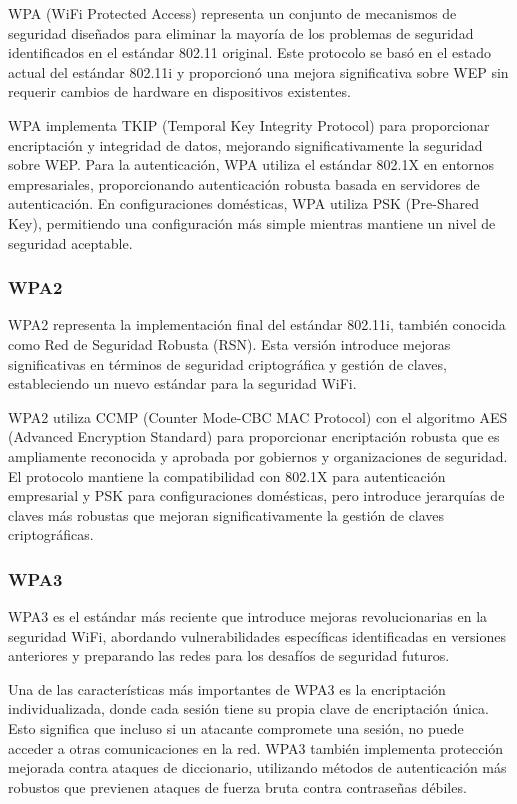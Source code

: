 WPA (WiFi Protected Access) representa un conjunto de mecanismos de seguridad diseñados para eliminar la mayoría de los problemas de seguridad identificados en el estándar 802.11 original. Este protocolo se basó en el estado actual del estándar 802.11i y proporcionó una mejora significativa sobre WEP sin requerir cambios de hardware en dispositivos existentes.

WPA implementa TKIP (Temporal Key Integrity Protocol) para proporcionar encriptación y integridad de datos, mejorando significativamente la seguridad sobre WEP. Para la autenticación, WPA utiliza el estándar 802.1X en entornos empresariales, proporcionando autenticación robusta basada en servidores de autenticación. En configuraciones domésticas, WPA utiliza PSK (Pre-Shared Key), permitiendo una configuración más simple mientras mantiene un nivel de seguridad aceptable.

\subsubsection{WPA2}

WPA2 representa la implementación final del estándar 802.11i, también conocida como Red de Seguridad Robusta (RSN). Esta versión introduce mejoras significativas en términos de seguridad criptográfica y gestión de claves, estableciendo un nuevo estándar para la seguridad WiFi.

WPA2 utiliza CCMP (Counter Mode-CBC MAC Protocol) con el algoritmo AES (Advanced Encryption Standard) para proporcionar encriptación robusta que es ampliamente reconocida y aprobada por gobiernos y organizaciones de seguridad. El protocolo mantiene la compatibilidad con 802.1X para autenticación empresarial y PSK para configuraciones domésticas, pero introduce jerarquías de claves más robustas que mejoran significativamente la gestión de claves criptográficas.

\subsubsection{WPA3}

WPA3 es el estándar más reciente que introduce mejoras revolucionarias en la seguridad WiFi, abordando vulnerabilidades específicas identificadas en versiones anteriores y preparando las redes para los desafíos de seguridad futuros.

Una de las características más importantes de WPA3 es la encriptación individualizada, donde cada sesión tiene su propia clave de encriptación única. Esto significa que incluso si un atacante compromete una sesión, no puede acceder a otras comunicaciones en la red. WPA3 también implementa protección mejorada contra ataques de diccionario, utilizando métodos de autenticación más robustos que previenen ataques de fuerza bruta contra contraseñas débiles.

